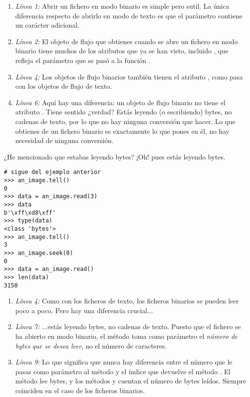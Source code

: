 \begin{enumerate}

\item \emph{Línea 1:} Abrir un fichero en modo binario es simple pero sutil. La única diferencia respecto de abrirlo en modo de texto es que el parámetro  contiene un carácter  adicional.

\item \emph{Línea 2:} El objeto de flujo que obtienes cuando se abre un fichero en modo binario tiene muchos de los atributos que ya se han visto, incluido , que refleja el parámetro  que se pasó a la función .

\item \emph{Línea 4:} Los objetos de flujo binarios también tienen el atributo , como pasa con los objetos de flujo de texto.

\item \emph{Línea 6:} Aquí hay una diferencia: un objeto de flujo binario no tiene el atributo . Tiene sentido ¿verdad? Estás leyendo (o escribiendo) bytes, no cadenas de texto, por lo que no hay ninguna conversión que hacer. Lo que obtienes de un fichero binario es exactamente lo que pones en él, no hay necesidad de ninguna conversión.

\end{enumerate}

¿He mencionado que estabas leyendo bytes? ¡Oh! pues estás leyendo bytes.

\noindent\begin{minipage}{\textwidth}
\begin{lstlisting}[mathescape=True]
# sigue del ejemplo anterior
>>> an_image.tell()
0
>>> data = an_image.read(3)
>>> data
b'\xff\xd8\xff'
>>> type(data)
<class 'bytes'>
>>> an_image.tell()
3
>>> an_image.seek(0)
0
>>> data = an_image.read()
>>> len(data)
3150
\end{lstlisting}
\end{minipage}

\begin{enumerate}

\item \emph{Línea 4:} Como con los ficheros de texto, los ficheros binarios se pueden leer poco a poco. Pero hay una diferencia crucial...

\item \emph{Línea 7:} ...estás leyendo bytes, no cadenas de texto. Puesto que el fichero se ha abierto en modo binario, el método  toma como parámetro el \emph{número de bytes que se desea leer}, no el número de caracteres.

\item \emph{Línea 9:} Lo que significa que nunca hay diferencia entre el número que le pasas como parámetro al método  y el índice que devuelve el método . El método  lee bytes, y los métodos  y  cuentan el número de bytes leídos. Siempre coinciden en el caso de los ficheros binarios.

\end{enumerate}

